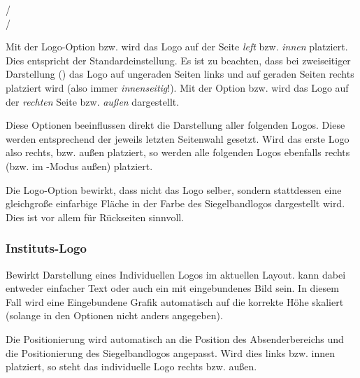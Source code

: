 \begin{Declaration}
  /\\
  /
\end{Declaration}

Mit der Logo-Option  bzw.  wird das Logo auf der Seite
\emph{left} bzw. \emph{innen} platziert. Dies entspricht der Standardeinstellung.
Es ist zu beachten, dass bei zweiseitiger Darstellung ()
das Logo auf ungeraden Seiten links und auf geraden Seiten rechts platziert wird
(also immer \emph{innenseitig}!).
Mit der Option  bzw.  wird das Logo auf der \emph{rechten}
Seite bzw. \emph{außen} dargestellt.

\begin{important}
Diese Optionen beeinflussen direkt die Darstellung aller folgenden Logos.
Diese werden entsprechend der jeweils letzten Seitenwahl gesetzt.
Wird das erste Logo also rechts, bzw. außen platziert, so werden alle folgenden
Logos ebenfalls rechts (bzw. im -Modus außen) platziert.
\end{important}

\begin{Declaration}
\end{Declaration}

Die Logo-Option  bewirkt, dass nicht das Logo selber,
sondern stattdessen eine gleichgroße einfarbige Fläche in der Farbe
des Siegelbandlogos dargestellt wird.
Dies ist vor allem für Rückseiten sinnvoll.


\subsubsection{Instituts-Logo}

\vspace*{-5mm}
\begin{Declaration}
\end{Declaration}

Bewirkt Darstellung eines Individuellen Logos im aktuellen Layout.
 kann dabei entweder einfacher Text oder auch ein 
mit  eingebundenes Bild sein.
In diesem Fall wird eine Eingebundene Grafik automatisch auf die korrekte
Höhe skaliert (solange in den Optionen nicht anders angegeben).

Die Positionierung wird automatisch an die Position des Absenderbereichs und
die Positionierung des Siegelbandlogos angepasst.
Wird dies links bzw. innen platziert, so steht das individuelle
Logo rechts bzw. außen.

